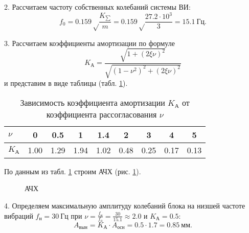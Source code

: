 2. Рассчитаем частоту собственных колебаний системы ВИ:
\[
    f_0 = 0.159 \sqrt \frac{K_{\sum}}{m}
        = 0.159 \sqrt \frac{27.2 \cdot 10^3}{3}
        = 15.1~Гц.
\]

3. Рассчитаем коэффициенты амортизации по формуле
\[
    K_А = \frac{\sqrt{1 + (2 \xi \nu)^2}}{\sqrt{(1 - \nu^2)^2 + (2 \xi \nu)^2}}
\]
и представим в виде таблицы (табл. \ref{tab:amortisation_coeffs}).

\begin{table}[!h]
    \centering
    \caption{Зависимость коэффициента амортизации $K_А$ от коэффициента рассогласования $\nu$}
    \label{tab:amortisation_coeffs}
    \begin{tabular}{|l|c|c|c|c|c|c|c|c|}
        \hline
        $\nu$  & 0    & 0.5  & 1    & 1.4  & 2    & 3    & 4    & 5    \\ \hline
        $K_А$  & 1.00 & 1.29 & 1.94 & 1.02 & 0.48 & 0.25 & 0.17 & 0.13 \\ \hline
    \end{tabular}
\end{table}

По данным из табл. \ref{tab:amortisation_coeffs} строим АЧХ (рис. \ref{fig:frequency-response}).

\begin{figure}[!h]
    \centering
    \caption{АЧХ}
    \label{fig:frequency-response}
\end{figure}

4. Определяем максимальную амплитуду колебаний блока на низшей частоте вибраций $f_н = 30~Гц$ при $\nu = \frac{f_н}{f_0} = \frac{30}{15.1} \approx 2.0$ и $K_А = 0.5$:
\[
    A_{вын} = K_А \cdot A_{осн}
    = 0.5 \cdot 1.7
    = 0.85~мм.
\]

